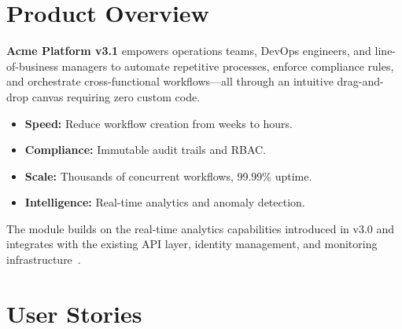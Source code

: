\documentclass[
    language=english,
    doctype=article,
    institution=none,
]{../../omnilatex}
\begin{document}
\maketitle

\begin{abstract}
This document specifies the Acme Platform v3.1 Advanced Workflow Automation
module---a visual, low-code environment enabling enterprise customers to
design, deploy, and manage complex operational workflows without custom code.
It covers product scope, feature priorities, architecture, non-functional
requirements, and the release roadmap.
\end{abstract}

\tableofcontents

\section{Product Overview}

\begin{tcolorbox}[colback=blue!5!white, colframe=blue!75!black,
    title={\sffamily\bfseries Value Proposition}, fonttitle=\sffamily\large,
    leftrule=4mm, arc=2mm, enhanced]
\textbf{Acme Platform v3.1} empowers operations teams, DevOps engineers,
and line-of-business managers to automate repetitive processes, enforce
compliance rules, and orchestrate cross-functional workflows---all through
an intuitive drag-and-drop canvas requiring zero custom code.
\begin{itemize}
    \item \textbf{Speed:} Reduce workflow creation from weeks to hours.
    \item \textbf{Compliance:} Immutable audit trails and RBAC.
    \item \textbf{Scale:} Thousands of concurrent workflows, 99.99\% uptime.
    \item \textbf{Intelligence:} Real-time analytics and anomaly detection.
\end{itemize}
\end{tcolorbox}

The module builds on the real-time analytics capabilities introduced in v3.0
and integrates with the existing API layer, identity management, and
monitoring infrastructure~\cite{acme2026platform}.

\section{User Stories}
\end{document}
